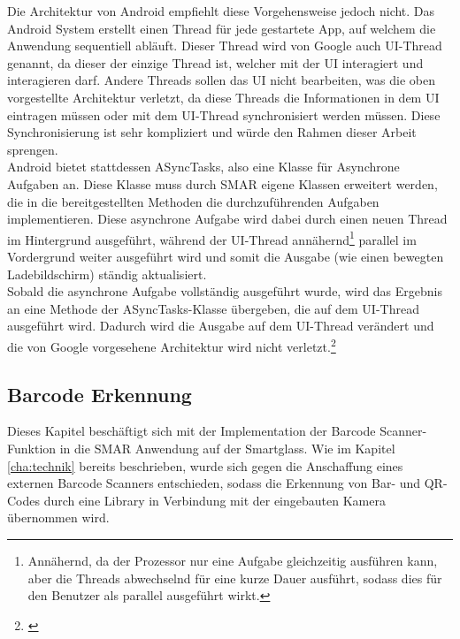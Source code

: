 Die Architektur von Android empfiehlt diese Vorgehensweise jedoch nicht. Das Android System erstellt einen Thread für jede gestartete App, auf welchem die Anwendung sequentiell abläuft. Dieser Thread wird von Google auch UI-Thread genannt, da dieser der einzige Thread ist, welcher mit der \ac{UI} interagiert und interagieren darf. Andere Threads sollen das \ac{UI} nicht bearbeiten, was die oben vorgestellte Architektur verletzt, da diese Threads die Informationen in dem \ac{UI} eintragen müssen oder mit dem UI-Thread synchronisiert werden müssen. Diese Synchronisierung ist sehr kompliziert und würde den Rahmen dieser Arbeit sprengen.\\

Android bietet stattdessen \glqq ASyncTasks\grqq , also eine Klasse für Asynchrone Aufgaben an. Diese Klasse muss durch \ac{SMAR} eigene Klassen erweitert werden, die in die bereitgestellten Methoden die durchzuführenden Aufgaben implementieren. Diese asynchrone Aufgabe wird dabei durch einen neuen Thread im Hintergrund ausgeführt, während der UI-Thread  annähernd\footnote{Annähernd, da der Prozessor nur eine Aufgabe gleichzeitig ausführen kann, aber die Threads abwechselnd für eine kurze Dauer ausführt, sodass dies für den Benutzer als parallel ausgeführt wirkt.} parallel im Vordergrund weiter ausgeführt wird und somit die Ausgabe (wie \zB einen bewegten Ladebildschirm) ständig aktualisiert.\\
Sobald die asynchrone Aufgabe vollständig ausgeführt wurde, wird das Ergebnis an eine Methode der ASyncTasks-Klasse übergeben, die auf dem UI-Thread ausgeführt wird. Dadurch wird  die Ausgabe auf dem UI-Thread verändert und die von Google vorgesehene Architektur wird nicht verletzt.\footnote{\citep[S. 115ff.]{android_threads}}

\subsection{Barcode Erkennung}
\label{sec:barcode}
Dieses Kapitel beschäftigt sich mit der Implementation der Barcode Scanner-Funktion in die \ac{SMAR} Anwendung auf der Smartglass. Wie im Kapitel \ref{cha:technik}  bereits beschrieben, wurde sich gegen die Anschaffung eines externen Barcode Scanners entschieden, sodass die Erkennung von Bar- und QR-Codes durch eine Library in Verbindung mit der eingebauten Kamera übernommen wird.\\

